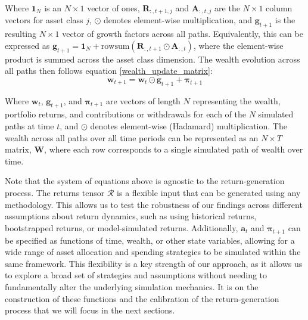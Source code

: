 \documentclass[11pt]{article}
\begin{document}
Where \(\mathbf{1}_N\) is an \(N \times 1\) vector of ones, \(\mathbf{R}_{:,t+1,j}\) and \(\mathbf{A}_{:,t,j}\) are the \(N \times 1\) column vectors for asset class \(j\), \(\odot\) denotes element-wise multiplication, and \(\mathbf{g}_{t+1}\) is the resulting \(N \times 1\) vector of growth factors across all paths. Equivalently, this can be expressed as \(\mathbf{g}_{t+1} = \mathbf{1}_N + \text{rowsum}(\mathbf{R}_{:,t+1} \odot \mathbf{A}_{:,t})\), where the element-wise product is summed across the asset class dimension. The wealth evolution across all paths then follows equation \ref{wealth_update_matrix}:
\begin{equation}\label{wealth_update_matrix}
\mathbf{w}_{t+1} = \mathbf{w}_t \odot \mathbf{g}_{t+1} + \boldsymbol{\pi}_{t+1}
\end{equation}

Where \(\mathbf{w}_t\), \(\mathbf{g}_{t+1}\), and \(\boldsymbol{\pi}_{t+1}\) are vectors of length \(N\) representing the wealth, portfolio returns, and contributions or withdrawals for each of the \(N\) simulated paths at time \(t\), and \(\odot\) denotes element-wise (Hadamard) multiplication. The wealth across all paths over all time periods can be represented as an \(N \times T\) matrix, \(\mathbf{W}\), where each row corresponds to a single simulated path of wealth over time. 

Note that the system of equations above is agnostic to the return-generation process. The returns tensor \(\mathcal{R}\) is a flexible input that can be generated using any methodology. This allows us to test the robustness of our findings across different assumptions about return dynamics, such as using historical returns, bootstrapped returns, or model-simulated returns. Additionally, \(\mathbf{a}_t\) and \(\boldsymbol{\pi}_{t+1}\) can be specified as functions of time, wealth, or other state variables, allowing for a wide range of asset allocation and spending strategies to be simulated within the same framework. This flexibility is a key strength of our approach, as it allows us to explore a broad set of strategies and assumptions without needing to fundamentally alter the underlying simulation mechanics. It is on the construction of these functions and the calibration of the return-generation process that we will focus in the next sections.
\end{document}

